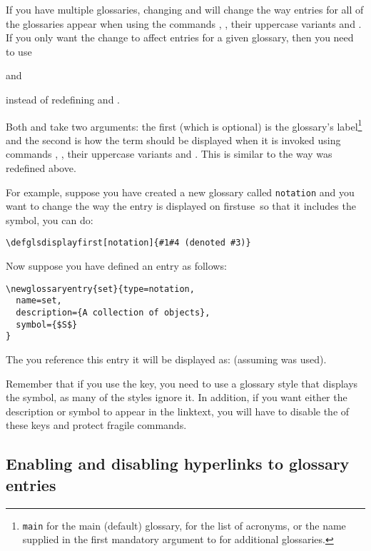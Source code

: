 \documentclass{nlctdoc}
\let\glsation\glsuserii
\newcommand*{\firstuse}{\gls{firstuse}}
\newcommand*{\gloskey}[2][newglossaryentry]{\csopt{#1}{#2}}
\begin{document}
If you have multiple glossaries, changing  and
 will change the way entries for all of the
glossaries appear when using the commands , , their
uppercase variants and .  If you only
want the change to affect entries for a given glossary, then you need
to use
\begin{definition}
\end{definition}
and
\begin{definition}
\end{definition}
instead of redefining  and .

Both  and  take two arguments:
the first (which is optional) is the glossary's label\footnote{\texttt{main} for the main
(default) glossary,  for the list of acronyms, or the
name supplied in the first mandatory argument to  for
additional glossaries.} and the second is how the term should be
displayed when it is invoked using commands , 
, their uppercase variants and . This is similar to the way  was
redefined above.

For example, suppose you have created a new glossary called
\texttt{notation} and you want to change the way the entry is
displayed on \firstuse\ so that it includes the symbol, you can do:
\begin{verbatim}
\defglsdisplayfirst[notation]{#1#4 (denoted #3)}
\end{verbatim}
Now suppose you have defined an entry as follows:
\begin{verbatim}
\newglossaryentry{set}{type=notation,
  name=set,
  description={A collection of objects},
  symbol={$S$}
}
\end{verbatim}
The  you reference this entry it will be displayed as:
 (assuming  was used).

Remember that if you use the \gloskey{symbol} key, you need to use a
glossary style that displays the symbol, as many of the styles
ignore it. In addition, if you want either the description or symbol
to appear in the \gls{linktext}, you will have to disable the
\glsation{sanitize} of these keys and protect fragile
commands.

\subsection{Enabling and disabling hyperlinks to glossary entries}
\end{document}
